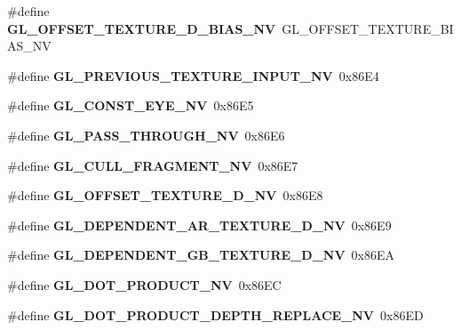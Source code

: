 \begin{DoxyCompactItemize}
\item 
\#define {\bfseries G\+L\+\_\+\+O\+F\+F\+S\+E\+T\+\_\+\+T\+E\+X\+T\+U\+R\+E\+\_\+D\+\_\+\+B\+I\+A\+S\+\_\+\+N\+V}~G\+L\+\_\+\+O\+F\+F\+S\+E\+T\+\_\+\+T\+E\+X\+T\+U\+R\+E\+\_\+\+B\+I\+A\+S\+\_\+\+N\+V\label{_s_d_l__opengl_8h_acaa73746324416aba5fd0f4eac797491}

\item 
\#define {\bfseries G\+L\+\_\+\+P\+R\+E\+V\+I\+O\+U\+S\+\_\+\+T\+E\+X\+T\+U\+R\+E\+\_\+\+I\+N\+P\+U\+T\+\_\+\+N\+V}~0x86\+E4\label{_s_d_l__opengl_8h_a777bbfa42658ab348f7f8d945a6667b9}

\item 
\#define {\bfseries G\+L\+\_\+\+C\+O\+N\+S\+T\+\_\+\+E\+Y\+E\+\_\+\+N\+V}~0x86\+E5\label{_s_d_l__opengl_8h_a190e1c02a523f98a8a9df4277c569424}

\item 
\#define {\bfseries G\+L\+\_\+\+P\+A\+S\+S\+\_\+\+T\+H\+R\+O\+U\+G\+H\+\_\+\+N\+V}~0x86\+E6\label{_s_d_l__opengl_8h_a19c58a991e692368f8d79dba02e4e6a7}

\item 
\#define {\bfseries G\+L\+\_\+\+C\+U\+L\+L\+\_\+\+F\+R\+A\+G\+M\+E\+N\+T\+\_\+\+N\+V}~0x86\+E7\label{_s_d_l__opengl_8h_ad7f4946a511e88becb3dd04e9efad0fd}

\item 
\#define {\bfseries G\+L\+\_\+\+O\+F\+F\+S\+E\+T\+\_\+\+T\+E\+X\+T\+U\+R\+E\+\_\+D\+\_\+\+N\+V}~0x86\+E8\label{_s_d_l__opengl_8h_a38bbc1682b0b12cb0080d963b953d5f5}

\item 
\#define {\bfseries G\+L\+\_\+\+D\+E\+P\+E\+N\+D\+E\+N\+T\+\_\+\+A\+R\+\_\+\+T\+E\+X\+T\+U\+R\+E\+\_\+D\+\_\+\+N\+V}~0x86\+E9\label{_s_d_l__opengl_8h_a4ee6c310195270edf473cd33480554d3}

\item 
\#define {\bfseries G\+L\+\_\+\+D\+E\+P\+E\+N\+D\+E\+N\+T\+\_\+\+G\+B\+\_\+\+T\+E\+X\+T\+U\+R\+E\+\_\+D\+\_\+\+N\+V}~0x86\+E\+A\label{_s_d_l__opengl_8h_a3a42ad63d1b163b3e6690010163bb243}

\item 
\#define {\bfseries G\+L\+\_\+\+D\+O\+T\+\_\+\+P\+R\+O\+D\+U\+C\+T\+\_\+\+N\+V}~0x86\+E\+C\label{_s_d_l__opengl_8h_a08be6f36d1b4bba5253fd5236c377fba}

\item 
\#define {\bfseries G\+L\+\_\+\+D\+O\+T\+\_\+\+P\+R\+O\+D\+U\+C\+T\+\_\+\+D\+E\+P\+T\+H\+\_\+\+R\+E\+P\+L\+A\+C\+E\+\_\+\+N\+V}~0x86\+E\+D\label{_s_d_l__opengl_8h_a01534ab6e3994a4516559377f663f565}


\end{DoxyCompactItemize}

